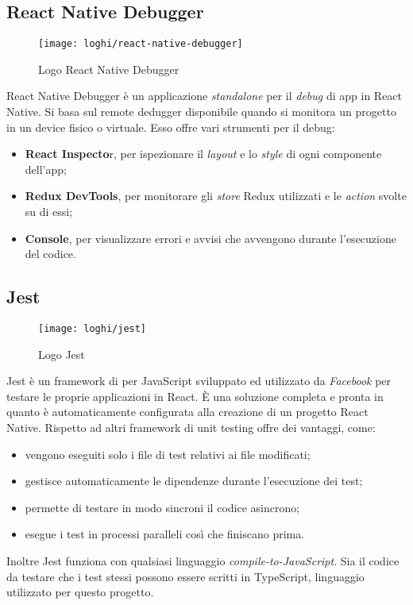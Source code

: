 \subsection{React Native Debugger}
\begin{figure}[H] 
	\centering
	\texttt{[image: loghi/react-native-debugger]}
	\caption{Logo React Native Debugger}
\end{figure}
React Native Debugger è un applicazione \emph{standalone} per il \emph{debug} di app in React 
Native. Si basa sul remote dedugger disponibile quando si monitora un progetto 
in un device fisico o virtuale.
\newpage
Esso offre vari strumenti per il debug:
\begin{itemize}
	\item \textbf{React Inspecto}r, per ispezionare il \emph{layout} e lo \emph{style} di ogni componente dell'app;
	\item \textbf{Redux DevTools}, per monitorare gli \emph{store} Redux utilizzati e le \emph{action} svolte su di essi;
	\item \textbf{Console}, per visualizzare errori e avvisi che avvengono durante l'esecuzione del codice.
\end{itemize}

\subsection{Jest} \label{subsez:jest}
\begin{figure}[H] 
	\centering
	\texttt{[image: loghi/jest]}
	\caption{Logo Jest}
\end{figure}
Jest è un framework di  per JavaScript sviluppato ed utilizzato da 
\emph{Facebook} per testare le proprie applicazioni in React. È una soluzione completa 
e pronta in quanto è automaticamente configurata alla creazione di un progetto 
React Native.
Rispetto ad altri framework di unit testing offre dei vantaggi, come: 
\begin{itemize}
	\item vengono eseguiti solo i file di test relativi ai file modificati;
	\item gestisce automaticamente le dipendenze durante l'esecuzione dei test;
	\item permette di testare in modo sincroni il codice asincrono;
	\item esegue i test in processi paralleli così che finiscano prima.
\end{itemize}
Inoltre Jest funziona con qualsiasi linguaggio \emph{compile-to-JavaScript}. 
Sia il codice da testare che i test stessi possono essere scritti in TypeScript, 
linguaggio utilizzato per questo progetto. 
